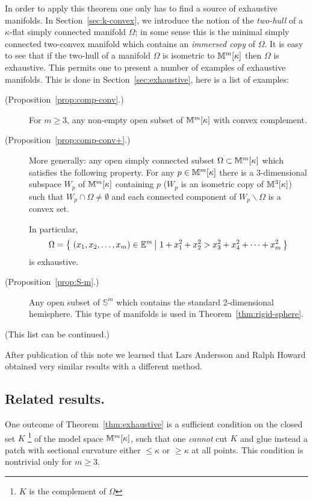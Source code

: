 \documentclass[oneside,a4paper]{article}
\begin{document}
In order to apply this theorem one only has to find a source of exhaustive manifolds.
In Section~\ref{sec:k-convex}, we introduce the notion of the {\it two-hull} of a $\kappa$-flat simply connected  manifold $\Omega$;
in some sense this is the minimal simply connected two-convex manifold which contains  an \emph{immersed copy} of $\Omega$.
It is easy to see that  if the two-hull of a manifold $\Omega$ is isometric to $\mathbb{M}^m[\kappa]$ then $\Omega$ is exhaustive.
This permits one to present a number of examples of exhaustive manifolds.
This is done in Section~\ref{sec:exhaustive},
here is a list of examples:
\begin{description}

\item[(Proposition~\ref{prop:comp-conv}.)] For $m\ge 3$, any non-empty open subset of $\mathbb{M}^m[\kappa]$ with convex complement.

\item[(Proposition~\ref{prop:comp-conv+}.)]
More generally:
any open simply connected subset $\Omega\z\subset\MM^m[\kappa]$ which satisfies the following property.
For any $p\in \mathbb{M}^m[\kappa]$
there is a 3-dimensional subspace $W_p$ of $\mathbb{M}^m[\kappa]$ containing $p$
($W_p$ is an isometric copy of $\mathbb{M}^3[\kappa]$)
such that $W_p\cap\Omega\not=\emptyset$
and each connected component of $W_p\backslash\Omega$ is a convex set.

In particular,
$$\Omega
=
\set{(x_1,x_2,\dots,x_m)\in \EE^m}{1+x_1^2+x_2^2>x_3^2+x_4^2+\dots+x_m^2}
$$
is exhaustive.

\item[(Proposition~\ref{prop:S-m}.)] Any  open subset of $\mathbb S^m$ which
contains the standard 2-dimensional hemisphere.
This type of manifolds is used in Theorem~\ref{thm:rigid-sphere}.

\end{description}
(This list can be continued.)


After publication of this note we learned that  Lars Andersson and Ralph Howard \cite{andersson-howard} obtained very similar results with a different method.

\subsection*{Related results.}

One outcome of Theorem~\ref{thm:exhaustive} is a sufficient condition on the closed set $K$%
\footnote{$K$ is the complement of $\Omega$} of the model space $\mathbb{M}^m[\kappa]$,
such that one \emph{cannot} cut $K$ and glue instead a patch with sectional curvature either $\le \kappa$ or $\ge \kappa$ at all points. 
This condition is nontrivial only for $m\ge 3$.
\end{document}
